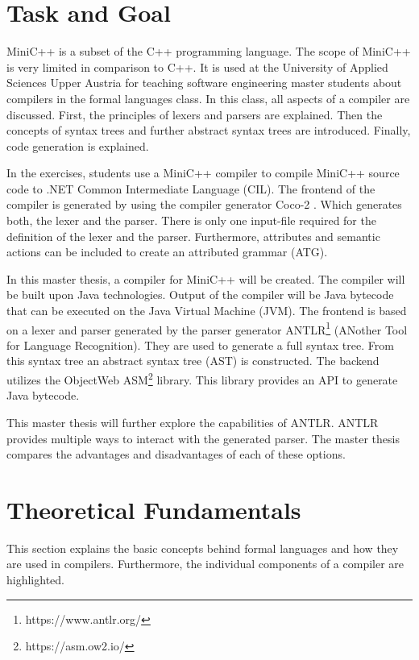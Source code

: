 \section{Task and Goal}

MiniC++ is a subset of the C++ programming language. The scope of MiniC++ is very limited in comparison to C++. It is used at the University of Applied Sciences Upper Austria for teaching software engineering master students about compilers in the formal languages class. In this class, all aspects of a compiler are discussed. First, the principles of lexers and parsers are explained. Then the concepts of syntax trees and further abstract syntax trees are introduced. Finally, code generation is explained. 

In the exercises, students use a MiniC++ compiler to compile MiniC++ source code to .NET Common Intermediate Language (CIL). The frontend of the compiler is generated by using the compiler generator Coco-2 \parencite{doblerCoco2}. Which generates both, the lexer and the parser. There is only one input-file required for the definition of the lexer and the parser. Furthermore, attributes and semantic actions can be included to create an attributed grammar (ATG). 

In this master thesis, a compiler for MiniC++ will be created. The compiler will be built upon Java technologies. Output of the compiler will be Java bytecode that can be executed on the Java Virtual Machine (JVM). The frontend is based on a lexer and parser generated by the parser generator ANTLR\footnote{https://www.antlr.org/} (ANother Tool for Language Recognition). They are used to generate a full syntax tree. From this syntax tree an abstract syntax tree (AST) is constructed. The backend utilizes the ObjectWeb ASM\footnote{https://asm.ow2.io/} library. This library provides an API to generate Java bytecode. 

This master thesis will further explore the capabilities of ANTLR. ANTLR provides multiple ways to interact with the generated parser. The master thesis compares the advantages and disadvantages of each of these options.

\section{Theoretical Fundamentals}

This section explains the basic concepts behind formal languages and how they are used in compilers. Furthermore, the individual components of a compiler are highlighted. 

